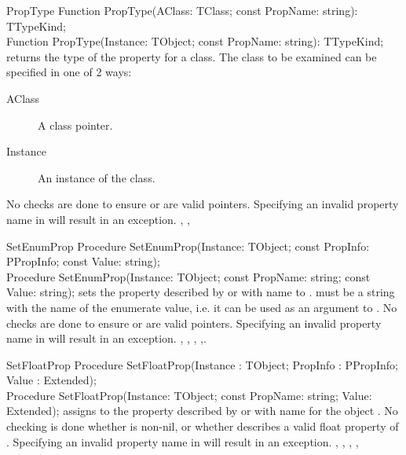 \begin{function}{PropType}
\Declaration
Function PropType(AClass: TClass; const PropName: string): TTypeKind;\\
Function PropType(Instance: TObject; const PropName: string): TTypeKind;
\Description
{} returns the type of the property  for a class.
The class to be examined can be specified in one of 2 ways:
\begin{description}
\item[AClass] A class pointer. 
\item[Instance] An instance of the class.
\end{description}
\Errors
No checks are done to ensure  or  are valid
pointers. Specifying an invalid property name in  will result
in an  exception.
\SeeAlso
{}, , 
\end{function}

\begin{procedure}{SetEnumProp}
\Declaration
Procedure SetEnumProp(Instance: TObject; const PropInfo: PPropInfo;
                      const Value: string);\\
Procedure SetEnumProp(Instance: TObject; const PropName: string;
                      const Value: string);                      
\Description
{} sets the property described by  or with name
 to .  must be a string with the name
of the enumerate value, i.e. it can be used as an argument to 
.
\Errors
No checks are done to ensure  or  are valid
pointers. Specifying an invalid property name in  will result
in an  exception.                                           
\SeeAlso
{}, , ,
,.
\end{procedure}

\begin{procedure}{SetFloatProp}
\Declaration
Procedure SetFloatProp(Instance : TObject;
                       PropInfo : PPropInfo;
                       Value : Extended);\\
Procedure SetFloatProp(Instance: TObject; 
                       const PropName: string; 
                       Value: Extended);
\Description
{} assigns  to the property described by
 or with name  for the object .
\Errors
No checking is done whether  is non-nil, or whether
 describes a valid float property of .
Specifying an invalid property name in  will result in an
 exception.
\SeeAlso
{}, , ,
,
\end{procedure}

